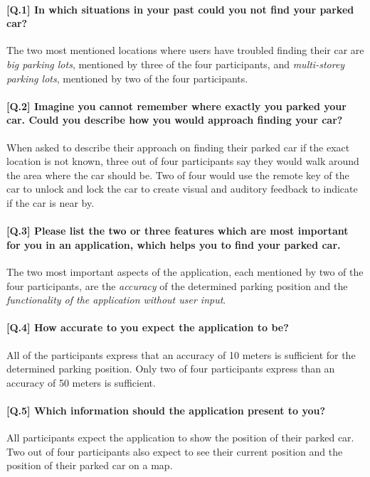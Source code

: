     
\paragraph{[Q.1] In which situations in your past could you not find your parked car?}
The two most mentioned locations where users have troubled finding their car are \textit{big parking lots}, mentioned by three of the four participants, and \textit{multi-storey parking lots}, mentioned by two of the four participants.

\paragraph{[Q.2] Imagine you cannot remember where exactly you parked your car. Could you describe how you would approach finding your car?}
When asked to describe their approach on finding their parked car if the exact location is not known, three out of four participants say they would walk around the area where the car should be. Two of four would use the remote key of the car to unlock and lock the car to create visual and auditory feedback to indicate if the car is near by.

\paragraph{[Q.3] Please list the two or three features which are most important for you in an application, which helps you to find your parked car.}
The two most important aspects of the application, each mentioned by two of the four participants, are the \textit{accuracy} of the determined parking position and the \textit{functionality of the application without user input}.

\paragraph{[Q.4] How accurate to you expect the application to be?}
All of the participants express that an accuracy of 10 meters is sufficient for the determined parking position. Only two of four participants express than an accuracy of 50 meters is sufficient.

\paragraph{[Q.5] Which information should the application present to you?}
All participants expect the application to show the position of their parked car. Two out of four participants also expect to see their current position and the position of their parked car on a map. 

